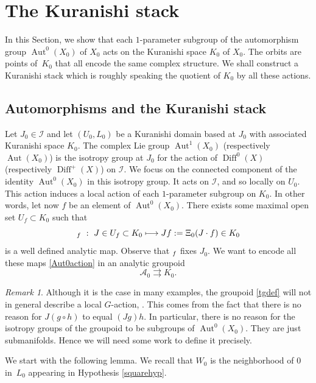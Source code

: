 \documentclass[10pt]{amsart}
\let\mathcal\mathscr
\newcommand{\NoChangel}[1]{%
\expandafter\let\csname old\string#1\endcsname=#1
\let#1=\relax
\newcommand{#1}{\mathcode`l="716C\csname old\string#1\endcsname\mathcode`l="7160 }%
}
\def\mto{\mathchoice{\longmapsto}{\mapsto}{\mapsto}{\mapsto}}
\DeclareMathOperator{\Aut}{Aut}
\DeclareMathOperator{\Diff}{Diff}
\DeclareMathOperator{\Hol}{Hol}\NoChangel{\Hol}
\theoremstyle{plain}
\theoremstyle{definition}
\theoremstyle{remark}
\newtheorem{remark}[theorem]{Remark}
\numberwithin{equation}{section}
\newcommand{\Azero}{\Aut^0(X_0)}
\newcommand{\cI}{\mathcal{I}}
\begin{document}
\section{The Kuranishi stack}
\label{Kuranishisection}
In this Section, we show that each $1$-parameter subgroup of the automorphism group $\Azero$ of $X_0$ acts on the Kuranishi space $K_0$ of $X_0$. The orbits are points of~$K_0$ that all encode the same complex structure. We shall construct a Kuranishi stack which is roughly speaking the quotient of $K_0$ by all these actions.

\subsection{Automorphisms and the Kuranishi stack}
\label{localaction}
Let $J_0\in\cI$ and let $(U_0,L_0)$ be a Kuranishi domain based at $J_0$ with associated Kuranishi space $K_0$. The complex Lie group $\Aut^1(X_0)$ (respectively $\Aut(X_0)$) is the isotropy group at $J_0$ for the action of $\Diff^0(X)$ (respectively $\Diff^+(X)$) on $\cI$. We focus on the connected component of the identity $\Aut^0(X_0)$ in this isotropy group. It acts on $\cI$, and so locally on $U_0$. This action induces a local action of each $1$-parameter subgroup on $K_0$. In other words, let now $f$ be an element of $\Azero$. There exists some maximal open set $U_f\subset K_0$ such that
\begin{equation}
\label{Aut0action}
\Hol_f\ :\ J\in U_f\subset K_0\mto Jf:=\Xi_0(J\cdot f)\in K_0
\end{equation}
is a well defined analytic map. Observe that $\Hol_f$ fixes $J_0$. We want to encode all these maps \eqref{Aut0action} in an analytic groupoid
\begin{equation}
\label{tgdef}
\mathcal A_0\rightrightarrows K_0.
\end{equation}
\begin{remark}
\label{notanaction}
Although it is the case in many examples, the groupoid \eqref{tgdef} will not in general describe a local $G$-action, \cf \cite{An}. This comes from the fact that there is no reason for $J(g\circ h)$ to equal $(Jg)h$. In particular, there is no reason for the isotropy groups of the groupoid to be subgroups of $ \Aut^0(X_0)$. They are just submanifolds. Hence we will need some work to define it precisely.
\end{remark}
We start with the following lemma. We recall that $W_0$ is the neighborhood of $0$ in~$L_0$ appearing in Hypothesis \ref{squarehyp}.
\end{document}
